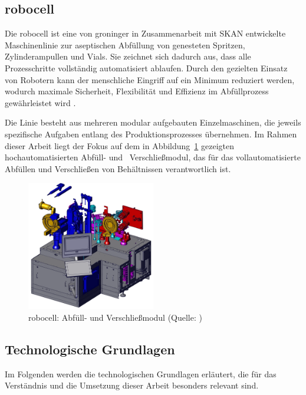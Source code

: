 \subsection{robocell}
Die robocell ist eine von groninger in Zusammenarbeit mit SKAN entwickelte Maschinenlinie zur aseptischen Abfüllung von genesteten Spritzen, Zylinderampullen und Vials.
Sie zeichnet sich dadurch aus, dass alle Prozesschritte vollständig automatisiert ablaufen.
Durch den gezielten Einsatz von Robotern kann der menschliche Eingriff auf ein Minimum reduziert werden, wodurch maximale Sicherheit, Flexibilität und Effizienz im Abfüllprozess gewährleistet wird \cite{RobocellWebsite}.

Die Linie besteht aus mehreren modular aufgebauten Einzelmaschinen, die jeweils spezifische Aufgaben entlang des Produktionsprozesses übernehmen. 
Im Rahmen dieser Arbeit liegt der Fokus auf dem in Abbildung~\ref{fig:robocell} gezeigten hochautomatisierten Abfüll- und%
\pagebreak
~Verschließmodul, das für das vollautomatisierte Abfüllen und Verschließen von Behältnissen verantwortlich ist.

\begin{figure}[htbp]
    \centering
    \includegraphics[width=0.5\textwidth]{Bilder/robocell/filling_closing_module.png}
    \caption[robocell: Abfüll- und Verschließmodul]{robocell: Abfüll- und Verschließmodul (Quelle: \cite{RobocellBetriebsanleitung})}
    \label{fig:robocell}
\end{figure}

\vspace{-0.25em}
\subsection{Technologische Grundlagen}
Im Folgenden werden die technologischen Grundlagen erläutert, die für das Verständnis und die Umsetzung dieser Arbeit besonders relevant sind.

